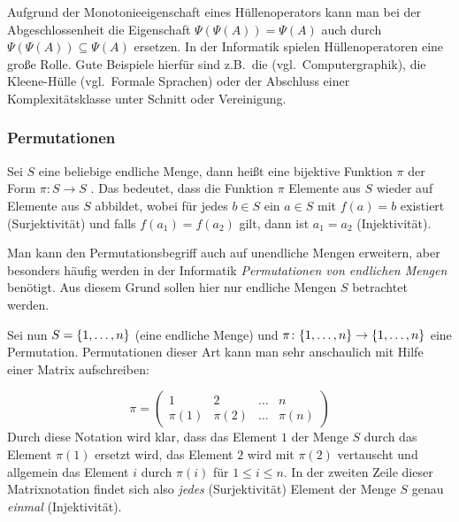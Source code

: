 Aufgrund der Monotonieeigenschaft eines Hüllenoperators kann man bei der Abgeschlossenheit die Eigenschaft $\Psi(\Psi(A)) = \Psi(A)$ auch durch $\Psi(\Psi(A)) \subseteq \Psi(A)$ ersetzen. In der Informatik spielen Hüllenoperatoren eine große Rolle. Gute Beispiele hierfür sind z.B.~die  (vgl.~Computergraphik), die Kleene-Hülle (vgl.~Formale Sprachen) oder der Abschluss einer Komplexitätsklasse unter Schnitt oder Vereinigung. 

\ifdiscretemath
%
%
\else

\subsubsection{Permutationen}
\label{Permutationen}
Sei $S$ eine beliebige endliche Menge, dann heißt eine bijektive Funktion $\pi$ der Form 
$\pi \colon S \rightarrow S$ \index{$\pi$}. Das bedeutet, dass die
Funktion $\pi$ Elemente aus $S$ wieder auf Elemente aus $S$ abbildet,
wobei für jedes $b \in S$ ein $a \in S$ mit $f(a) = b$ existiert
(Surjektivität) und falls $f(a_1) = f(a_2)$ gilt, dann ist $a_1 = a_2$
(Injektivität).

\begin{remark}
 Man kann den Permutationsbegriff auch auf unendliche Mengen erweitern, aber besonders häufig werden in der Informatik \emph{Permutationen von endlichen Mengen} benötigt. Aus diesem Grund sollen hier nur endliche Mengen $S$ betrachtet werden.
\end{remark}

Sei nun $S = \{1, \dots ,n\}$ (eine endliche Menge) und
$\pi \colon \{1, \dots ,n\} \rightarrow \{1, \dots ,n\}$ eine
Permutation. Permutationen dieser Art kann man sehr anschaulich mit
Hilfe einer Matrix aufschreiben:

\begin{displaymath}
\pi = \left( 
\begin{array}{cccc}
1 & 2 & \dots & n\\
\pi(1) & \pi(2) & \dots & \pi(n)
\end{array}
\right)
\end{displaymath}
Durch diese Notation wird klar, dass das Element $1$ der Menge $S$
durch das Element $\pi(1)$ ersetzt wird, das Element $2$ wird mit
$\pi(2)$ vertauscht und allgemein das Element $i$ durch $\pi(i)$ für
$1 \le i \le n$. In der zweiten Zeile dieser Matrixnotation findet
sich also \emph{jedes} (Surjektivität) Element der Menge $S$
genau \emph{einmal} (Injektivität).

